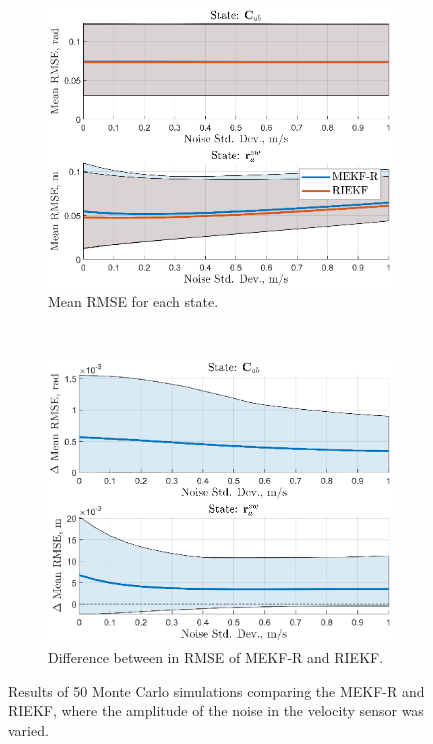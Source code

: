 \begin{figure}
	\centering
	\begin{subfigure}[b]{0.5\textwidth}
		\includegraphics[width=\textwidth]{figs/se3/noise_trials/comp_noise_rmse_state_Vel_R.eps}
		\caption{Mean RMSE for each state.}
	\end{subfigure}
	~
	\begin{subfigure}[b]{0.5\textwidth}
		\includegraphics[width=\textwidth]{figs/se3/noise_trials/comp_noise_diff_state_Vel_R.eps}
		\caption{Difference between in RMSE of MEKF-R and RIEKF.}
	\end{subfigure}
	\caption[Results comparing the MEKF-R and RIEKF varying velocity sensor noise.]{Results of 50 Monte Carlo simulations comparing the MEKF-R and RIEKF, where the amplitude of the noise in the velocity sensor was varied. }
	\label{fig:comp_noise_vel_R}
\end{figure}

